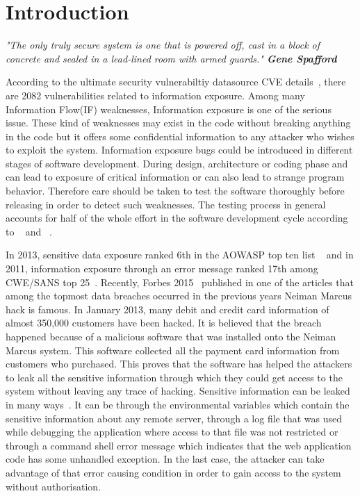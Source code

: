 \let\cleardoublepage\clearpage
\chapter{Introduction}
\label{chapter:Introduction}


\textit{"The only truly secure system is one that is powered off, cast in a block of concrete 
and sealed in a lead-lined room with armed guards."
\textemdash  \textbf{ Gene Spafford}} \smallskip

According to the ultimate security vulnerabiltiy datasource CVE details~\cite{cve:details},
there are 2082 vulnerabilities related to information exposure. Among many Information Flow(IF) weaknesses, Information exposure is one of the serious issue.
These kind of weaknesses may exist in the code without breaking anything in the code but it
offers some confidential information to any attacker who wishes to exploit the system. Information exposure bugs could be introduced
in different stages of software development. During design, architecture or coding phase and
can lead to exposure of critical information or can also lead to strange program behavior. Therefore
care should be taken to test the software thoroughly before releasing in order to detect such weaknesses.
The testing process in general accounts for half of the whole effort in the software development cycle
according to ~\cite{King:2008} and ~\cite{Kushwaha:test}.

In 2013, sensitive data exposure ranked 
6th in the AOWASP top ten list ~\cite{top:vul} and in 2011, information exposure through an error message ranked 17th 
among CWE/SANS top 25~\cite{top:25}.
Recently, Forbes 2015~\cite{forbes:bill} published in one of the articles that
among the topmost data breaches occurred in the 
previous years Neiman Marcus hack is famous.
In January 2013, many debit and credit card information of almost 350,000 customers have been
hacked. It is believed that the breach happened because of a malicious software
that was installed onto the Neiman Marcus system. This software collected all the payment
card information from customers who purchased.
This proves that the software has helped the attackers to leak all the sensitive information
through which they could get access to the system without leaving any trace of hacking.
Sensitive information can be leaked in many ways~\cite{mitre:CWE}. It can be through the environmental variables 
which contain the sensitive information about any remote server, through a log file that was
used while debugging the application where access to that file was not restricted or through a
command shell error message which indicates that the web application code has some unhandled exception.
In the last case, the attacker can take advantage of that error causing
condition in order to gain access to the system without authorisation.

